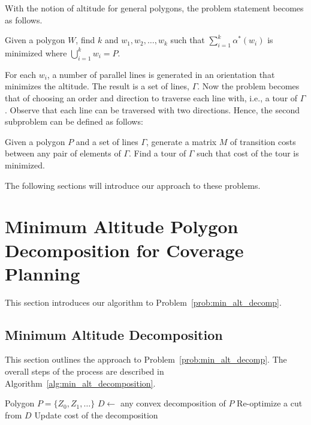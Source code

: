 \documentclass[../main.tex]{subfiles}
\begin{document}
With the notion of altitude for general polygons, the problem statement becomes as follows.
\begin{problem}
\label{prob:min_alt_decomp}
Given a polygon $W$, find $k$ and $w_1,w_2,\ldots,w_k$ such that $\sum^k_{i=1}\alpha^*(w_i)$ is minimized where $\bigcup^k_{i=1}w_i=P$.
\end{problem}

For each $w_i$, a number of parallel lines is generated in an orientation that minimizes the altitude. The result is a set of lines, $\Gamma$. Now the problem becomes that of choosing an order and direction to traverse each line with, i.e., a tour of $\Gamma$. Observe that each line can be traversed with two directions. Hence, the second subproblem can be defined as follows:

\begin{problem}
\label{prob:min_tour}
Given a polygon $P$ and a set of lines $\Gamma$, generate a matrix $M$ of transition costs between any pair of elements of $\Gamma$. Find a tour of $\Gamma$ such that cost of the tour is minimized.
\end{problem}

The following sections will introduce our approach to these problems.

\section{Minimum Altitude Polygon Decomposition for Coverage Planning}
\label{section:min_alt_decomposition}

This section introduces our algorithm to Problem~\ref{prob:min_alt_decomp}.

\subsection{Minimum Altitude Decomposition}
This section outlines the approach to Problem~\ref{prob:min_alt_decomp}. The overall steps of the process are described in Algorithm~\ref{alg:min_alt_decomposition}.
\begin{algorithm}
	\caption{$\operatorname{min\_alt\_decomposition}(P)$}
	\label{alg:min_alt_decomposition}
	\begin{algorithmic}[1]
		\REQUIRE Polygon $P=\{Z_0,Z_1,\ldots\}$
			\STATE $D\gets$ any convex decomposition of $P$	\label{line:cvx_decomp}
			\REPEAT
				\STATE Re-optimize a cut from $D$ \label{line:opt_cut_2}
				\STATE Update cost of the decomposition \label{line:update_cost}
	\end{algorithmic}
\end{algorithm}
\end{document}
